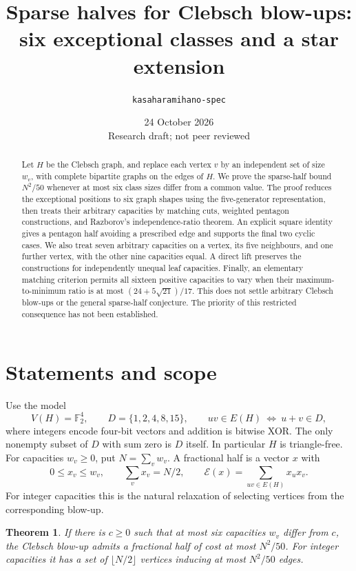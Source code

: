 \documentclass[11pt]{article}
\title{Sparse halves for Clebsch blow-ups:\\six exceptional classes and a star extension}
\author{\texttt{kasaharamihano-spec}}
\date{24 October 2026\\[3pt]\small Research draft; not peer reviewed}
\newtheorem{theorem}{Theorem}
\newcommand{\F}{\mathbb F}
\newcommand{\E}{\mathcal E}
\begin{document}
\maketitle
\begin{abstract}
Let $H$ be the Clebsch graph, and replace each vertex $v$ by an independent
set of size $w_v$, with complete bipartite graphs on the edges of $H$.
We prove the sparse-half bound $N^2/50$ whenever at most six class sizes
differ from a common value. The proof reduces the exceptional positions
to six graph shapes using the five-generator representation, then treats
their arbitrary capacities by matching cuts, weighted pentagon
constructions, and Razborov's independence-ratio theorem.
An explicit square identity gives a pentagon half avoiding a prescribed
edge and supports the final two cyclic cases.
We also treat seven arbitrary capacities on a vertex, its five neighbours,
and one further vertex, with the other nine capacities equal. A direct
lift preserves the constructions for independently unequal leaf capacities.
Finally, an elementary matching criterion permits all sixteen positive
capacities to vary when their maximum-to-minimum ratio is at most
$(24+5\sqrt{21})/17$.
This does not settle arbitrary Clebsch blow-ups or the general
sparse-half conjecture. The priority of this restricted consequence
has not been established.
\end{abstract}

\section{Statements and scope}
Use the model
\[
 V(H)=\F_2^4,\qquad
 D=\{1,2,4,8,15\},\qquad uv\in E(H)\ \Longleftrightarrow\ u+v\in D ,
\]
where integers encode four-bit vectors and addition is bitwise XOR.
The only nonempty subset of $D$ with sum zero is $D$ itself. In particular
$H$ is triangle-free. For capacities $w_v\geq0$, put $N=\sum_v w_v$.
A fractional half is a vector $x$ with
\[
 0\leq x_v\leq w_v,\qquad \sum_vx_v=N/2,\qquad
 \E(x)=\sum_{uv\in E(H)}x_ux_v .
\]
For integer capacities this is the natural relaxation of selecting vertices
from the corresponding blow-up.

\begin{theorem}\label{thm:main}
If there is $c\geq0$ such that at most six capacities $w_v$ differ from $c$,
the Clebsch blow-up admits a fractional half of cost at most $N^2/50$.
For integer capacities it has a set of $\lfloor N/2\rfloor$ vertices
inducing at most $N^2/50$ edges.
\end{theorem}
\end{document}
